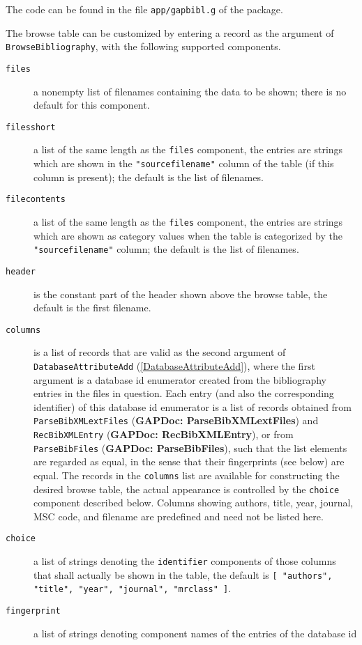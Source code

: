 \documentclass[a4paper,11pt]{report}
\begin{document}
{{{ The code can be found in the file \texttt{app/gapbibl.g} of the package. 

 The browse table can be customized by entering a record as the argument of \texttt{BrowseBibliography}, with the following supported components. 
\begin{description}
\item[{\texttt{files}}]  a nonempty list of filenames containing the data to be shown; there is no
default for this component. 
\item[{\texttt{filesshort}}]  a list of the same length as the \texttt{files} component, the entries are strings which are shown in the \texttt{"sourcefilename"} column of the table (if this column is present); the default is the list of
filenames. 
\item[{\texttt{filecontents}}]  a list of the same length as the \texttt{files} component, the entries are strings which are shown as category values when the
table is categorized by the \texttt{"sourcefilename"} column; the default is the list of filenames. 
\item[{\texttt{header}}]  is the constant part of the header shown above the browse table, the default
is the first filename. 
\item[{\texttt{columns}}]  is a list of records that are valid as the second argument of \texttt{DatabaseAttributeAdd} (\ref{DatabaseAttributeAdd}), where the first argument is a database id enumerator created from the
bibliography entries in the files in question. Each entry (and also the
corresponding identifier) of this database id enumerator is a list of records
obtained from \texttt{ParseBibXMLextFiles} (\textbf{GAPDoc: ParseBibXMLextFiles}) and \texttt{RecBibXMLEntry} (\textbf{GAPDoc: RecBibXMLEntry}), or from \texttt{ParseBibFiles} (\textbf{GAPDoc: ParseBibFiles}), such that the list elements are regarded as equal, in the sense that their
fingerprints (see below) are equal. The records in the \texttt{columns} list are available for constructing the desired browse table, the actual
appearance is controlled by the \texttt{choice} component described below. Columns showing authors, title, year, journal, MSC
code, and filename are predefined and need not be listed here. 
\item[{\texttt{choice}}]  a list of strings denoting the \texttt{identifier} components of those columns that shall actually be shown in the table, the
default is \texttt{[ "authors", "title", "year", "journal", "mrclass" ]}. 
\item[{\texttt{fingerprint}}]  a list of strings denoting component names of the entries of the database id

\end{description}}}}
\end{document}
